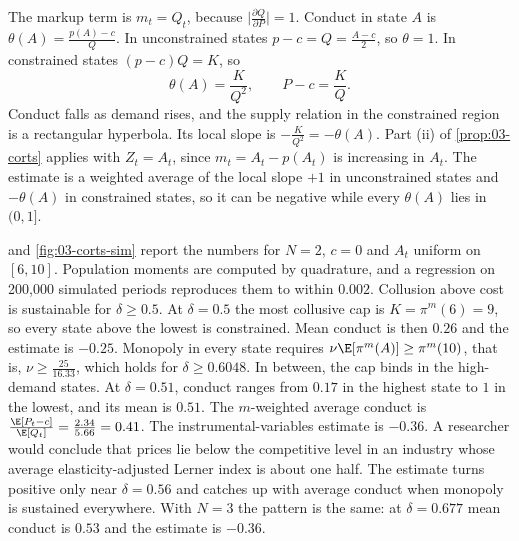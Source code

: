 The markup term is $m_t = Q_t$, because $\lvert\frac{\partial Q}{\partial P}\rvert = 1$. Conduct in state $A$ is
$\theta(A) = \frac{p(A) - c}{Q}$. In unconstrained states $p - c = Q = \frac{A - c}{2}$, so $\theta = 1$. In constrained
states $(p - c)Q = K$, so
\begin{equation*}
\theta(A) = \frac{K}{Q^2}, \qquad P - c = \frac{K}{Q} .
\end{equation*}
Conduct falls as demand rises, and the supply relation in the constrained region is a rectangular hyperbola. Its local
slope is $-\frac{K}{Q^2} = -\theta(A)$. Part (ii) of \cref{prop:03-corts} applies with $Z_t = A_t$, since $m_t = A_t - p(A_t)$
is increasing in $A_t$. The estimate is a weighted average of the local slope $+1$ in unconstrained states and $-\theta(A)$
in constrained states, so it can be negative while every $\theta(A)$ lies in $(0, 1]$.

 and \cref{fig:03-corts-sim} report the numbers for $N = 2$, $c = 0$ and $A_t$ uniform on $[6, 10]$.
Population moments are computed by quadrature, and a regression on 200,000 simulated periods reproduces them to within
$0.002$. Collusion above cost is sustainable for $\delta \ge 0.5$. At $\delta = 0.5$ the most collusive cap is
$K = \pi^m(6) = 9$, so every state above the lowest is constrained. Mean conduct is then $0.26$ and the estimate is
$-0.25$. Monopoly in every state requires $\nu\E[\pi^m(A)] \ge \pi^m(10)$, that is,
$\nu \ge \frac{25}{16.33}$, which holds for $\delta \ge 0.6048$. In between, the cap binds in the high-demand states. At
$\delta = 0.51$, conduct ranges from $0.17$ in the highest state to $1$ in the lowest, and its mean is $0.51$. The
$m$-weighted average conduct is $\frac{\E[P_t - c]}{\E[Q_t]} = \frac{2.34}{5.66} = 0.41$. The instrumental-variables
estimate is $-0.36$. A researcher would conclude that prices lie below the competitive level in an industry whose average
elasticity-adjusted Lerner index is about one half. The estimate turns positive only near $\delta = 0.56$ and catches up with
average conduct when monopoly is sustained everywhere. With $N = 3$ the pattern is the same: at $\delta = 0.677$ mean
conduct is $0.53$ and the estimate is $-0.36$.


